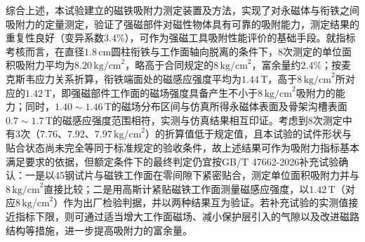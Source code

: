 综合上述，本试验建立的磁铁吸附力测定装置及方法，实现了对永磁体与衔铁之间吸附力的定量测定，验证了强磁部件对磁性物体具有可靠的吸附能力，测定结果的重复性良好（变异系数3.4\%），可作为强磁工具吸附性能评价的基础手段。就指标考核而言，在直径$1.8\,\text{cm}$圆柱衔铁与工作面轴向脱离的条件下，8次测定的单位面积吸附力平均为$8.20\,\text{kg/cm}^2$，略高于合同规定的$8\,\text{kg/cm}^2$，富余量约$2.4\%$；按麦克斯韦应力关系折算，衔铁端面处的磁感应强度平均为$1.44\,\text{T}$，高于$8\,\text{kg/cm}^2$所对应的$1.42\,\text{T}$，即强磁部件工作面的磁场强度具备产生不小于$8\,\text{kg/cm}^2$吸附力的能力；同时，$1.40\sim 1.46\,\text{T}$的磁场分布区间与仿真所得永磁体表面及骨架沟槽表面$0.7\sim 1.7\,\text{T}$的磁感应强度范围相符，实测与仿真结果相互印证。考虑到8次测定中有3次（$7.76$、$7.92$、$7.97\,\text{kg/cm}^2$）的折算值低于规定值，且本试验的试件形状与贴合状态尚未完全等同于标准规定的验收条件，故上述结果可作为吸附力指标基本满足要求的依据，但额定条件下的最终判定仍宜按GB/T 47662-2026补充试验确认：一是以45钢试片与磁铁工作面在零间隙下紧密贴合，测定单位面积吸附力并与$8\,\text{kg/cm}^2$直接比较；二是用高斯计紧贴磁铁工作面测量磁感应强度，以$1.42\,\text{T}$（对应$8\,\text{kg/cm}^2$）作为出厂检验判据，并以两种结果互为验证。若补充试验的实测值接近指标下限，则可通过适当增大工作面磁场、减小保护层引入的气隙以及改进磁路结构等措施，进一步提高吸附力的富余量。
